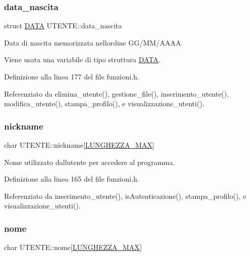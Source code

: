 \subsubsection{\texorpdfstring{data\+\_\+nascita}{data\_nascita}}
{\footnotesize\ttfamily struct \mbox{\hyperlink{struct_d_a_t_a}{D\+A\+TA}} U\+T\+E\+N\+T\+E\+::data\+\_\+nascita}



Data di nascita memorizzata nell\textquotesingle{}ordine G\+G/\+M\+M/\+A\+A\+AA. 

Viene usata una variabile di tipo struttura \mbox{\hyperlink{struct_d_a_t_a}{D\+A\+TA}}. 

Definizione alla linea 177 del file funzioni.\+h.



Referenziato da elimina\+\_\+utente(), gestione\+\_\+file(), inserimento\+\_\+utente(), modifica\+\_\+utente(), stampa\+\_\+profilo(), e visualizzazione\+\_\+utenti().

\mbox{\label{struct_u_t_e_n_t_e_a0ae0027764658fd60ce899a829b7b2fe}} 
\subsubsection{\texorpdfstring{nickname}{nickname}}
{\footnotesize\ttfamily char U\+T\+E\+N\+T\+E\+::nickname\mbox{[}\mbox{\hyperlink{funzioni_8h_a2cdd71b92d6e869f8b094e32a6da6a62}{L\+U\+N\+G\+H\+E\+Z\+Z\+A\+\_\+\+M\+AX}}\mbox{]}}

Nome utilizzato dall\textquotesingle{}utente per accedere al programma. 

Definizione alla linea 165 del file funzioni.\+h.



Referenziato da inserimento\+\_\+utente(), is\+Autenticazione(), stampa\+\_\+profilo(), e visualizzazione\+\_\+utenti().

\mbox{\label{struct_u_t_e_n_t_e_acd2869ae6d739de9978a588124906ae8}} 
\subsubsection{\texorpdfstring{nome}{nome}}
{\footnotesize\ttfamily char U\+T\+E\+N\+T\+E\+::nome\mbox{[}\mbox{\hyperlink{funzioni_8h_a2cdd71b92d6e869f8b094e32a6da6a62}{L\+U\+N\+G\+H\+E\+Z\+Z\+A\+\_\+\+M\+AX}}\mbox{]}}

